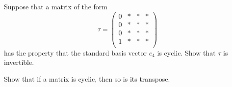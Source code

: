 \documentclass[reqno]{amsart} 
\begin{document}
\begin{exercise}\label{exercise:d1aa77216096}
  Suppose that a matrix of the form
  \begin{equation*}
    \tau =
    \begin{pmatrix}
      0 & \ast & \ast & \ast \\
      0 & \ast & \ast & \ast \\
      0 & \ast & \ast & \ast \\
      1 & \ast & \ast & \ast \\
    \end{pmatrix}
  \end{equation*}
  has the property that the standard basis vector $e_4$ is cyclic.  Show that $\tau$ is invertible.
\end{exercise}

\begin{exercise}\label{exercise:d1aa77219196}
Show that if a matrix is cyclic, then so is its transpose.
\end{exercise}



{} 
\end{document}
